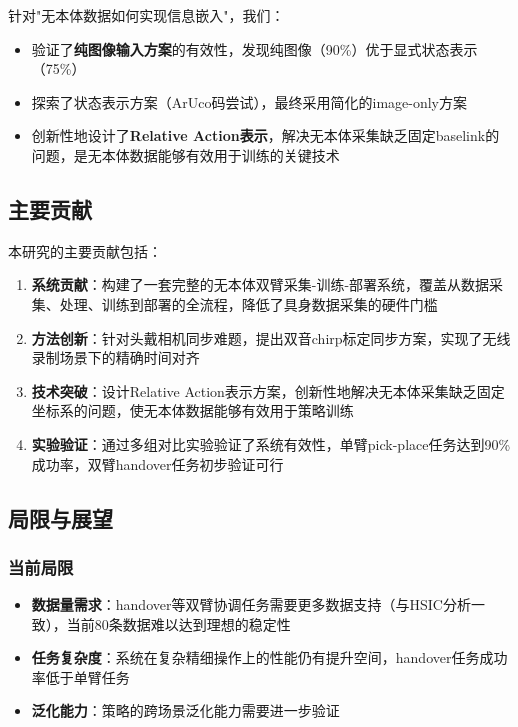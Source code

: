针对"无本体数据如何实现信息嵌入"，我们：
\begin{itemize}[leftmargin=2em]
    \item 验证了\textbf{纯图像输入方案}的有效性，发现纯图像（90\%）优于显式状态表示（75\%）
    \item 探索了状态表示方案（ArUco码尝试），最终采用简化的image-only方案
    \item 创新性地设计了\textbf{Relative Action表示}，解决无本体采集缺乏固定baselink的问题，是无本体数据能够有效用于训练的关键技术
\end{itemize}

\subsection{主要贡献}

本研究的主要贡献包括：

\begin{enumerate}[leftmargin=2em]
    \item \textbf{系统贡献}：构建了一套完整的无本体双臂采集-训练-部署系统，覆盖从数据采集、处理、训练到部署的全流程，降低了具身数据采集的硬件门槛
    
    \item \textbf{方法创新}：针对头戴相机同步难题，提出双音chirp标定同步方案，实现了无线录制场景下的精确时间对齐
    
    \item \textbf{技术突破}：设计Relative Action表示方案，创新性地解决无本体采集缺乏固定坐标系的问题，使无本体数据能够有效用于策略训练
    
    \item \textbf{实验验证}：通过多组对比实验验证了系统有效性，单臂pick-place任务达到90\%成功率，双臂handover任务初步验证可行
\end{enumerate}

\subsection{局限与展望}

\subsubsection{当前局限}

\begin{itemize}[leftmargin=2em]
    \item \textbf{数据量需求}：handover等双臂协调任务需要更多数据支持（与HSIC分析一致），当前80条数据难以达到理想的稳定性
    \item \textbf{任务复杂度}：系统在复杂精细操作上的性能仍有提升空间，handover任务成功率低于单臂任务
    \item \textbf{泛化能力}：策略的跨场景泛化能力需要进一步验证
\end{itemize}

